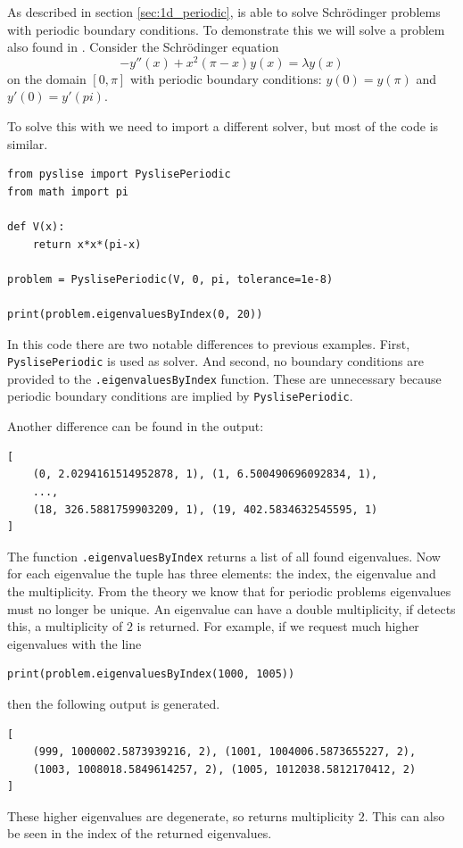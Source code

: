 As described in section \ref{sec:1d_periodic},  is able to solve Schrödinger problems with periodic boundary conditions. To demonstrate this we will solve a problem also found in \cite{andrew_correction_1989}. Consider the Schrödinger equation
$$
    -y''(x) + x^2(\pi-x) y(x) = \lambda y(x)
$$
on the domain $[0, \pi]$ with periodic boundary conditions: $y(0) = y(\pi)$ and $y'(0) = y'(pi)$.

To solve this with \pyslise{} we need to import a different solver, but most of the code is similar.
\begin{verbatim}
from pyslise import PyslisePeriodic
from math import pi

def V(x):
    return x*x*(pi-x)

problem = PyslisePeriodic(V, 0, pi, tolerance=1e-8)

print(problem.eigenvaluesByIndex(0, 20))
\end{verbatim}

In this code there are two notable differences to previous examples. First, \texttt{PyslisePeriodic} is used as solver. And second, no boundary conditions are provided to the \texttt{.eigenvaluesByIndex} function. These are unnecessary because periodic boundary conditions are implied by \texttt{PyslisePeriodic}.

Another difference can be found in the output:
\begin{verbatim}
[
    (0, 2.0294161514952878, 1), (1, 6.500490696092834, 1),
    ...,
    (18, 326.5881759903209, 1), (19, 402.5834632545595, 1)
]
\end{verbatim}

The function \texttt{.eigenvaluesByIndex} returns a list of all found eigenvalues. Now for each eigenvalue the tuple has three elements: the index, the eigenvalue and the multiplicity. From the theory we know that for periodic problems eigenvalues must no longer be unique. An eigenvalue can have a double multiplicity, if \pyslise{} detects this, a multiplicity of $2$ is returned. For example, if we request much higher eigenvalues with the line
\begin{verbatim}
print(problem.eigenvaluesByIndex(1000, 1005))
\end{verbatim}
then the following output is generated.
\begin{verbatim}
[
    (999, 1000002.5873939216, 2), (1001, 1004006.5873655227, 2),
    (1003, 1008018.5849614257, 2), (1005, 1012038.5812170412, 2)
]
\end{verbatim}
These higher eigenvalues are degenerate, so \pyslise{} returns multiplicity $2$. This can also be seen in the index of the returned eigenvalues.

